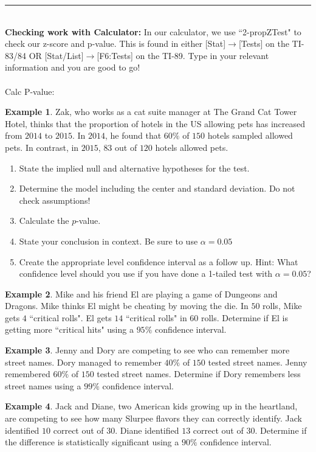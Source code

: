 \documentclass[12pt]{amsart}
\theoremstyle{definition}
\newtheorem{ex}{Example}
\begin{document}
\vfill
\vfill
\hrule
~\\
\noindent \textbf{Checking work with Calculator:} In our calculator, we use ``2-propZTest" to check our z-score and p-value. This is found in either [Stat]$\rightarrow$[Tests] on the TI-83/84 OR [Stat/List]$\rightarrow$[F6:Tests] on the TI-89. Type in your relevant information and you are good to go!\\
~\\
Calc P-value:
\newpage
\begin{ex}Zak, who works as a cat suite manager at The Grand Cat Tower Hotel, thinks that the proportion of hotels in the US allowing pets has increased from $2014$ to $2015$. In $2014$, he found that $60\%$ of $150$ hotels sampled allowed pets. In contrast, in $2015$, $83$ out of $120$ hotels allowed pets.
\begin{enumerate}
	\item State the implied null and alternative hypotheses for the test.
	\vfill
	\item Determine the model including the center and standard deviation. Do not check assumptions!
	\vfill
	\item Calculate the $p$-value. 
	\vfill
	\item State your conclusion in context. Be sure to use $\alpha=0.05$
	\vfill
	\item Create the appropriate level confidence interval as a follow up. Hint: What confidence level should you use if you have done a 1-tailed test with $\alpha=0.05$?
	\vfill
\end{enumerate}\end{ex}
\newpage
\begin{ex}
	Mike and his friend El are playing a game of Dungeons and Dragons. Mike thinks El might be cheating by moving the die. In $50$ rolls, Mike gets $4$ ``critical rolls". El gets $14$ ``critical rolls" in $60$ rolls. Determine if El is getting more ``critical hits" using a $95\%$ confidence interval.
\end{ex}

\begin{ex}
	Jenny and Dory are competing to see who can remember more street names. Dory managed to remember $40\%$ of $150$ tested street names. Jenny remembered $60\%$ of $150$ tested street names. Determine if Dory remembers less street names using a $99\%$ confidence interval.
\end{ex}

\begin{ex}
	Jack and Diane, two American kids growing up in the heartland, are competing to see how many Slurpee flavors they can correctly identify. Jack identified $10$ correct out of $30$. Diane identified $13$ correct out of $30$. Determine if the difference is statistically significant using a $90\%$ confidence interval.
\end{ex}
\end{document}
